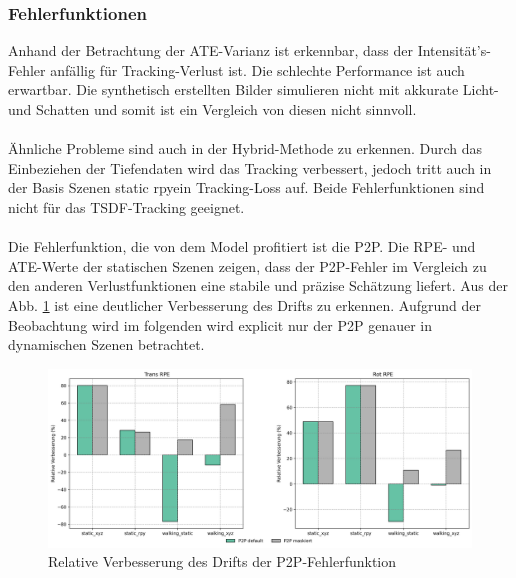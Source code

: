 \documentclass[12pt,DIV=15,BCOR=15mm,twoside,headsepline,abstract=true,listof=totoc,bibliography=totoc]{scrreprt}
\theoremstyle{remark}    %
\begin{document}
    \subsubsection{Fehlerfunktionen}
    Anhand der Betrachtung der \ac{ATE}-Varianz ist erkennbar, dass der Intensität's-Fehler anfällig für Tracking-Verlust ist. 
    Die schlechte Performance ist auch erwartbar. Die synthetisch erstellten Bilder simulieren nicht mit akkurate Licht- und Schatten und somit ist ein Vergleich von diesen
    nicht sinnvoll.\cite{dong2023ashmodernframeworkparallel}\\\\
    Ähnliche Probleme sind auch in der Hybrid-Methode zu erkennen. Durch das Einbeziehen der Tiefendaten wird das Tracking verbessert, jedoch tritt auch in 
    der Basis Szenen \glqq static rpy\grqq ein Tracking-Loss auf. Beide Fehlerfunktionen sind nicht für das \ac{TSDF}-Tracking geeignet.\\\\
    Die Fehlerfunktion, die von dem Model profitiert ist die \ac{P2P}. Die \ac{RPE}- und \ac{ATE}-Werte der statischen Szenen zeigen, dass der \ac{P2P}-Fehler im 
    Vergleich zu den anderen Verlustfunktionen eine stabile und präzise Schätzung liefert. Aus der Abb. \ref{fig:p2p_rel_RPE} ist eine deutlicher Verbesserung des 
    Drifts zu erkennen. Aufgrund der Beobachtung wird im folgenden wird explicit nur der \ac{P2P} genauer in dynamischen Szenen betrachtet.
    \begin{figure}[h]
        \centering
        \includegraphics[width=\textwidth]{pics/compose_RPE_com.png}
        \caption{Relative Verbesserung des Drifts der P2P-Fehlerfunktion}
        \label{fig:p2p_rel_RPE}
    \end{figure}
\end{document}
